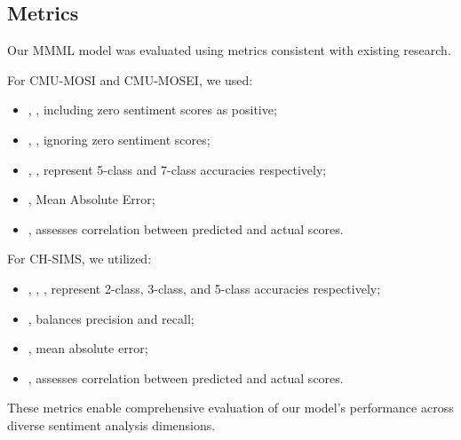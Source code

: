 \documentclass[11pt]{article}
\begin{document}
\subsection{Metrics}
Our MMML model was evaluated using metrics consistent with existing research. 

For CMU-MOSI and CMU-MOSEI, we used: 
\begin{itemize}
\item , , including zero sentiment scores as positive; 
\item , , ignoring zero sentiment scores;
\item , , represent 5-class and 7-class accuracies respectively; 
\item , Mean Absolute Error; 
\item , assesses correlation between predicted and actual scores.
\end{itemize}

For CH-SIMS, we utilized:
\begin{itemize}
\item , , , represent 2-class, 3-class, and 5-class accuracies respectively; 
\item , balances precision and recall; 
\item , mean absolute error; 
\item , assesses correlation between predicted and actual scores.
\end{itemize}
These metrics enable comprehensive evaluation of our model's performance across diverse sentiment analysis dimensions.
\end{document}
